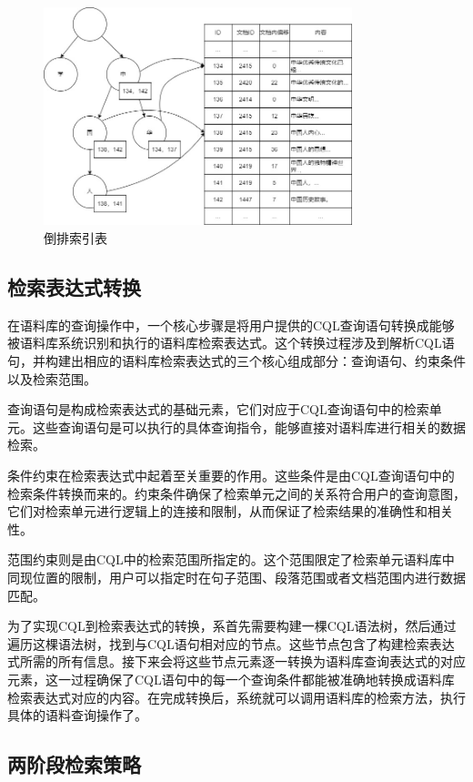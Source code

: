 \documentclass[11pt]{article}
\begin{document}
\begin{CJK*}{UTF8}{gbsn}
\begin{figure}[!h]
	\centering
	\includegraphics[width=0.8\textwidth]{image/daopaibiao.jpg}
	\caption{倒排索引表}
	\label{fig:daopaibiao}
\end{figure}

\subsection{检索表达式转换}

在语料库的查询操作中，一个核心步骤是将用户提供的CQL查询语句转换成能够被语料库系统识别和执行的语料库检索表达式。这个转换过程涉及到解析CQL语句，并构建出相应的语料库检索表达式的三个核心组成部分：查询语句、约束条件以及检索范围。

查询语句是构成检索表达式的基础元素，它们对应于CQL查询语句中的检索单元。这些查询语句是可以执行的具体查询指令，能够直接对语料库进行相关的数据检索。

条件约束在检索表达式中起着至关重要的作用。这些条件是由CQL查询语句中的检索条件转换而来的。约束条件确保了检索单元之间的关系符合用户的查询意图，它们对检索单元进行逻辑上的连接和限制，从而保证了检索结果的准确性和相关性。

范围约束则是由CQL中的检索范围所指定的。这个范围限定了检索单元语料库中同现位置的限制，用户可以指定时在句子范围、段落范围或者文档范围内进行数据匹配。

为了实现CQL到检索表达式的转换，系首先需要构建一棵CQL语法树，然后通过遍历这棵语法树，找到与CQL语句相对应的节点。这些节点包含了构建检索表达式所需的所有信息。接下来会将这些节点元素逐一转换为语料库查询表达式的对应元素，这一过程确保了CQL语句中的每一个查询条件都能被准确地转换成语料库检索表达式对应的内容。在完成转换后，系统就可以调用语料库的检索方法，执行具体的语料查询操作了。

\subsection{两阶段检索策略}


\end{CJK*}
\end{document}
